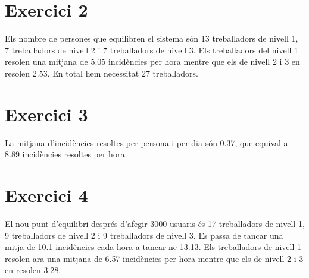 \documentclass[11pt,a4paper,twoside]{report}
\begin{document}
\begin{figure}%
  \centering
\end{figure}

\newpage
\section{Exercici 2}
Els nombre de persones que equilibren el sistema són 13 treballadors de nivell 1, 7 treballadors de nivell 2 i 7 treballadors de nivell 3.
\newline Els treballadors del nivell 1 resolen una mitjana de 5.05 incidències per hora mentre que els de nivell 2 i 3 en resolen 2.53.
En total hem necessitat 27 treballadors.

\section{Exercici 3}
La mitjana d'incidències resoltes per persona i per dia són 0.37, que equival a 8.89 incidències resoltes per hora.

\section{Exercici 4}
El nou punt d'equilibri després d'afegir 3000 usuaris és 17 treballadors de nivell 1, 9 treballadors de nivell 2 i 9 treballadors de nivell 3.
\newline Es passa de tancar una mitja de 10.1 incidències cada hora a tancar-ne 13.13.  
\newline Els treballadors de nivell 1 resolen ara una mitjana de 6.57 incidències per hora mentre que els de nivell 2 i 3 en resolen 3.28.
\end{document}
